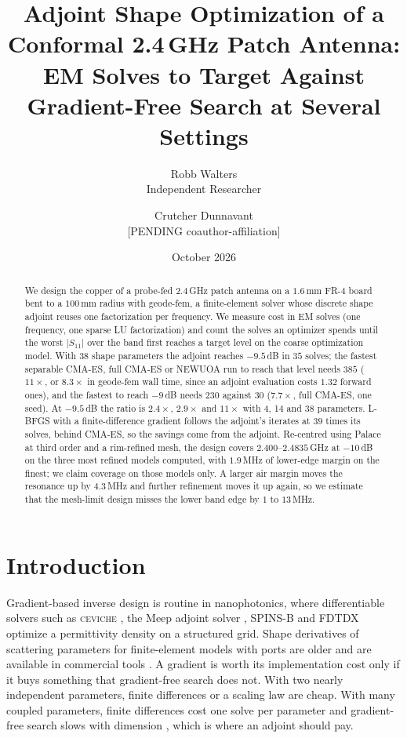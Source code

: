 \documentclass{anvil-paper}
\title{Adjoint Shape Optimization of a Conformal 2.4\,GHz Patch Antenna:
EM Solves to Target Against Gradient-Free Search at Several Settings}
\author{Robb Walters\\
  {\normalsize Independent Researcher}
  \and Crutcher Dunnavant\\
  {\normalsize [PENDING coauthor-affiliation]}}
\date{October 2026}
\begin{document}
\maketitle

\begin{abstract}
We design the copper of a probe-fed 2.4\,GHz patch antenna on a $1.6$\,mm
FR-4 board bent to a $100$\,mm radius with geode-fem, a finite-element
solver whose discrete shape adjoint reuses one factorization per frequency.
We measure cost in EM solves (one frequency, one sparse LU factorization) and
count the solves an optimizer spends until the worst $|S_{11}|$ over the band
first reaches a target level on the coarse optimization model. With
38 shape parameters the adjoint reaches $-9.5$\,dB in $35$ solves; the fastest
separable CMA-ES, full CMA-ES or NEWUOA run to reach that level needs $385$
($11\times$, or $8.3\times$ in geode-fem wall time, since an adjoint
evaluation costs $1.32$ forward ones), and the fastest to reach $-9$\,dB needs
$230$ against $30$ ($7.7\times$, full CMA-ES, one seed). At $-9.5$\,dB the
ratio is $2.4\times$, $2.9\times$ and $11\times$ with 4, 14 and 38 parameters.
L-BFGS with a finite-difference gradient follows the adjoint's iterates at
$39$ times its solves, behind CMA-ES, so the savings come from the adjoint.
Re-centred using Palace at third order and a rim-refined mesh, the design
covers $2.400$--$2.4835$\,GHz at $-10$\,dB on the three most refined models
computed, with $1.9$\,MHz of lower-edge margin on the finest; we claim
coverage on those models only. A larger air margin moves the resonance up by
$4.3$\,MHz and further refinement moves it up again, so we estimate that the
mesh-limit design misses the lower band edge by $1$ to $13$\,MHz.
\end{abstract}

\section{Introduction}
\label{sec:intro}

Gradient-based inverse design is routine in nanophotonics, where
differentiable solvers such as \textsc{ceviche} \citep{hughes2019forward},
the Meep adjoint solver \citep{hammond2022meepadjoint}, SPINS-B
\citep{su_spinsb} and FDTDX \citep{mahlau2026fdtdx} optimize a permittivity
density on a structured grid. Shape derivatives of scattering parameters for
finite-element models with ports are older
\citep{webb2000design,georgieva2002feasible,nikolova2004adjoint} and are
available in commercial tools
\citep{ansys_hfss_derivatives,comsol_sensitivity_method}. A gradient is worth
its implementation cost only if it buys something that gradient-free search
does not. With two nearly independent parameters, finite differences or a
scaling law are cheap. With many coupled parameters, finite differences cost
one solve per parameter and gradient-free search slows with dimension
\citep{rios2013derivative}, which is where an adjoint should pay.
\end{document}
